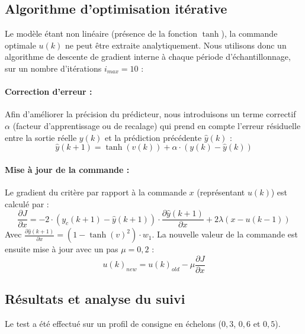 \subsection{Algorithme d'optimisation itérative}

Le modèle étant non linéaire (présence de la fonction $\tanh$), la commande optimale $u(k)$ ne peut être extraite analytiquement. Nous utilisons donc un algorithme de descente de gradient interne à chaque période d'échantillonnage, sur un nombre d'itérations $i_{max} = 10$ :

\paragraph{Correction d'erreur :}
Afin d'améliorer la précision du prédicteur, nous introduisons un terme correctif $\alpha$ (facteur d'apprentissage ou de recalage) qui prend en compte l'erreur résiduelle entre la sortie réelle $y(k)$ et la prédiction précédente $\hat{y}(k)$ :
\begin{equation}
	\hat{y}(k+1) = \tanh(v(k)) + \alpha \cdot (y(k) - \hat{y}(k))
\end{equation}

\paragraph{Mise à jour de la commande :}
Le gradient du critère par rapport à la commande $x$ (représentant $u(k)$) est calculé par :
\begin{equation}
	\frac{\partial J}{\partial x} = -2 \cdot (y_c(k+1) - \hat{y}(k+1)) \cdot \frac{\partial \hat{y}(k+1)}{\partial x} + 2\lambda(x - u(k-1))
\end{equation}
Avec $\frac{\partial \hat{y}(k+1)}{\partial x} = (1 - \tanh(v)^2) \cdot w_1$. La nouvelle valeur de la commande est ensuite mise à jour avec un pas $\mu = 0{,}2$ :
\begin{equation}
	u(k)_{new} = u(k)_{old} - \mu \frac{\partial J}{\partial x}
\end{equation}

\subsection{Résultats et analyse du suivi}

Le test a été effectué sur un profil de consigne en échelons ($0{,}3$, $0{,}6$ et $0{,}5$).

